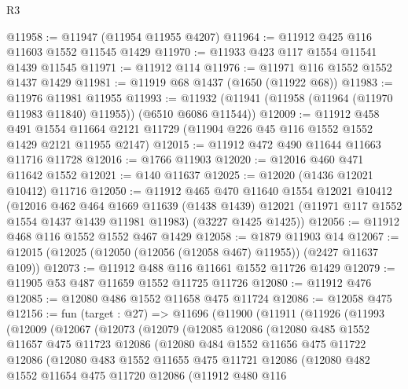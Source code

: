 \begin{lexlean}{R3}
\begin{coremodule}
@11958 := @11947 (@11954 @11955 @4207)
@11964 := @11912 @425 @116 @11603 @1552 @11545 @1429
@11970 := @11933 @423 @117 @1554 @11541 @1439 @11545
@11971 := @11912 @114
@11976 := @11971 @116 @1552 @1552 @1437 @1429
@11981 := @11919 @68 @1437 (@1650 (@11922 @68))
@11983 := @11976 @11981 @11955
@11993 := @11932 (@11941 (@11958 (@11964 (@11970 @11983 @11840) @11955)) (@6510 @6086 @11544))
@12009 := @11912
    @458
    @491
    @1554
    @11664
    @2121
    @11729
    (@11904 @226 @45 @116 @1552 @1552 @1429 @2121 @11955 @2147)
@12015 := @11912 @472 @490 @11644 @11663 @11716 @11728
@12016 := @1766 @11903
@12020 := @12016 @460 @471 @11642 @1552
@12021 := @140 @11637
@12025 := @12020 (@1436 @12021 @10412) @11716
@12050 := @11912
    @465
    @470
    @11640
    @1554
    @12021
    @10412
    (@12016
      @462
      @464
      @1669
      @11639
      (@1438 @1439)
      @12021
      (@11971 @117 @1552 @1554 @1437 @1439 @11981 @11983)
      (@3227 @1425 @1425))
@12056 := @11912 @468 @116 @1552 @1552 @467 @1429
@12058 := @1879 @11903 @14
@12067 := @12015 (@12025 (@12050 (@12056 (@12058 @467) @11955)) (@2427 @11637 @109))
@12073 := @11912 @488 @116 @11661 @1552 @11726 @1429
@12079 := @11905 @53 @487 @11659 @1552 @11725 @11726
@12080 := @11912 @476
@12085 := @12080 @486 @1552 @11658 @475 @11724
@12086 := @12058 @475
@12156 := fun (target : @27) =>
  @11696
    (@11900
      (@11911
        (@11926
          (@11993
            (@12009
              (@12067
                (@12073
                  (@12079
                    (@12085
                      @12086
                      (@12080
                        @485
                        @1552
                        @11657
                        @475
                        @11723
                        @12086
                        (@12080
                          @484
                          @1552
                          @11656
                          @475
                          @11722
                          @12086
                          (@12080
                            @483
                            @1552
                            @11655
                            @475
                            @11721
                            @12086
                            (@12080
                              @482
                              @1552
                              @11654
                              @475
                              @11720
                              @12086
                              (@11912
                                @480
                                @116

\end{coremodule}
\end{lexlean}
